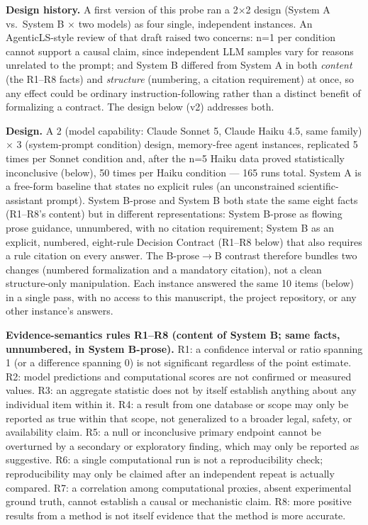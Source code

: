 \documentclass{article}
\begin{document}
\textbf{Design history.} A first version of this probe ran a 2$\times$2 design (System A vs.\ System B $\times$ two models) as four single, independent instances. An AgenticLS-style review of that draft raised two concerns: n=1 per condition cannot support a causal claim, since independent LLM samples vary for reasons unrelated to the prompt; and System B differed from System A in both \emph{content} (the R1--R8 facts) and \emph{structure} (numbering, a citation requirement) at once, so any effect could be ordinary instruction-following rather than a distinct benefit of formalizing a contract. The design below (v2) addresses both.

\textbf{Design.} A 2 (model capability: Claude Sonnet 5, Claude Haiku 4.5, same family) $\times$ 3 (system-prompt condition) design, memory-free agent instances, replicated 5 times per Sonnet condition and, after the n=5 Haiku data proved statistically inconclusive (below), 50 times per Haiku condition --- 165 runs total. System A is a free-form baseline that states no explicit rules (an unconstrained scientific-assistant prompt). System B-prose and System B both state the same eight facts (R1--R8's content) but in different representations: System B-prose as flowing prose guidance, unnumbered, with no citation requirement; System B as an explicit, numbered, eight-rule Decision Contract (R1--R8 below) that also requires a rule citation on every answer. The B-prose$\to$B contrast therefore bundles two changes (numbered formalization and a mandatory citation), not a clean structure-only manipulation. Each instance answered the same 10 items (below) in a single pass, with no access to this manuscript, the project repository, or any other instance's answers.

\textbf{Evidence-semantics rules R1--R8 (content of System B; same facts, unnumbered, in System B-prose).} R1: a confidence interval or ratio spanning 1 (or a difference spanning 0) is not significant regardless of the point estimate. R2: model predictions and computational scores are not confirmed or measured values. R3: an aggregate statistic does not by itself establish anything about any individual item within it. R4: a result from one database or scope may only be reported as true within that scope, not generalized to a broader legal, safety, or availability claim. R5: a null or inconclusive primary endpoint cannot be overturned by a secondary or exploratory finding, which may only be reported as suggestive. R6: a single computational run is not a reproducibility check; reproducibility may only be claimed after an independent repeat is actually compared. R7: a correlation among computational proxies, absent experimental ground truth, cannot establish a causal or mechanistic claim. R8: more positive results from a method is not itself evidence that the method is more accurate.
\end{document}
